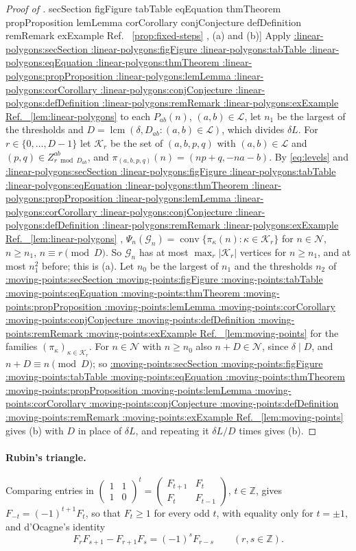 \documentclass[11pt,a4paper]{article}
\makeatletter
\def\Cref@getprefix#1:#2\relax{#1}
\def\Cref@prefix@sec{sec}
\def\Cref@prefix@fig{fig}
\def\Cref@prefix@tab{tab}
\def\Cref@prefix@eq{eq}
\def\Cref@prefix@thm{thm}
\def\Cref@prefix@prop{prop}
\def\Cref@prefix@lem{lem}
\def\Cref@prefix@cor{cor}
\def\Cref@prefix@conj{conj}
\def\Cref@prefix@def{def}
\def\Cref@prefix@rem{rem}
\def\Cref@prefix@ex{ex}
\def\Cref@type@cap#1{%
  \edef\Cref@tmp{#1}%
  \ifx\Cref@tmp\Cref@prefix@sec Section%
  \else\ifx\Cref@tmp\Cref@prefix@fig Figure%
  \else\ifx\Cref@tmp\Cref@prefix@tab Table%
  \else\ifx\Cref@tmp\Cref@prefix@eq Equation%
  \else\ifx\Cref@tmp\Cref@prefix@thm Theorem%
  \else\ifx\Cref@tmp\Cref@prefix@prop Proposition%
  \else\ifx\Cref@tmp\Cref@prefix@lem Lemma%
  \else\ifx\Cref@tmp\Cref@prefix@cor Corollary%
  \else\ifx\Cref@tmp\Cref@prefix@conj Conjecture%
  \else\ifx\Cref@tmp\Cref@prefix@def Definition%
  \else\ifx\Cref@tmp\Cref@prefix@rem Remark%
  \else\ifx\Cref@tmp\Cref@prefix@ex Example%
  \else Ref.%
  \fi\fi\fi\fi\fi\fi\fi\fi\fi\fi\fi\fi
}
\DeclareRobustCommand{\Cref}[1]{%
  \begingroup
  \edef\Cref@label{#1}%
  \edef\Cref@prefix{\expandafter\Cref@getprefix\Cref@label:\relax}%
  \hyperref[#1]{\Cref@type@cap{\Cref@prefix}~\ref*{#1}}%
  \endgroup
}
\theoremstyle{plain}
\theoremstyle{definition}
\theoremstyle{remark}
\newcommand{\Z}{\mathbb{Z}}
\makeatother
\begin{document}
\begin{proof}[Proof of \Cref{prop:fixed-steps}, (a) and (b)]
Apply \Cref{lem:linear-polygons} to each $P_{ab}(n)$, $(a,b)\in\mathcal L$, let $n_1$ be the largest of the thresholds and $D=\operatorname{lcm}(\delta,D_{ab}:(a,b)\in\mathcal L)$, which divides $\delta L$.
For $r\in\{0,\dots,D-1\}$ let $\mathcal K_r$ be the set of $(a,b,p,q)$ with $(a,b)\in\mathcal L$ and $(p,q)\in Z^{ab}_{r\bmod D_{ab}}$, and $\pi_{(a,b,p,q)}(n)=(np+q,-na-b)$.
By \eqref{eq:levels} and \Cref{lem:linear-polygons}, $\Psi_n(\mathcal G_n)=\operatorname{conv}\{\pi_\kappa(n):\kappa\in\mathcal K_r\}$ for $n\in\mathcal N$, $n\ge n_1$, $n\equiv r\pmod D$.
So $\mathcal G_n$ has at most $\max_r|\mathcal K_r|$ vertices for $n\ge n_1$, and at most $n_1^2$ before; this is (a).
Let $n_0$ be the largest of $n_1$ and the thresholds $n_2$ of \Cref{lem:moving-points} for the families $(\pi_\kappa)_{\kappa\in\mathcal K_r}$.
For $n\in\mathcal N$ with $n\ge n_0$ also $n+D\in\mathcal N$, since $\delta\mid D$, and $n+D\equiv n\pmod D$; so \Cref{lem:moving-points} gives (b) with $D$ in place of $\delta L$, and repeating it $\delta L/D$ times gives (b).
\end{proof}

\paragraph{Rubin's triangle.}
Comparing entries in $\begin{pmatrix}1&1\\1&0\end{pmatrix}^t=\begin{pmatrix}F_{t+1}&F_t\\F_t&F_{t-1}\end{pmatrix}$, $t\in\Z$, gives $F_{-t}=(-1)^{t+1}F_t$, so that $F_t\ge1$ for every odd $t$, with equality only for $t=\pm1$, and d'Ocagne's identity
\begin{equation}
\label{eq:docagne}
F_rF_{s+1}-F_{r+1}F_s=(-1)^sF_{r-s}\qquad(r,s\in\Z).
\end{equation}
\end{document}
